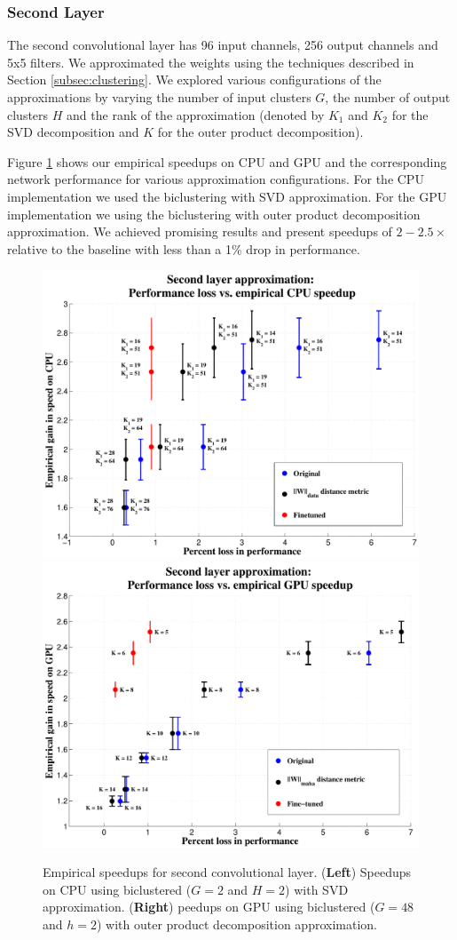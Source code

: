 \subsubsection{Second Layer}
The second convolutional layer has 96 input channels, 256 output channels and 5x5 filters. 
We approximated the weights using the techniques described in Section \ref{subsec:clustering}. 
We explored various configurations of the approximations by varying the number of input clusters $G$, the number of output clusters $H$ and the rank of the approximation (denoted by $K_1$ and $K_2$ for the SVD decomposition and $K$ for the outer product decomposition). 

Figure \ref{fig:biclust_speedups} shows our empirical speedups on CPU
and GPU and the corresponding network performance for
various approximation configurations. For the CPU implementation we used the biclustering with SVD approximation. For the GPU implementation we using the biclustering with outer product decomposition approximation.  
We achieved promising results and present speedups of $2-2.5\times$ relative to the baseline with less than a 1\% drop in performance.

\begin{figure}[t]
\centering
\begin{minipage}{0.9\textwidth}
      \includegraphics[width=0.5\linewidth]{img/layer2_CPUspeedup_vs_performance_loss_finetune_and_orig.pdf}
      \quad
      \includegraphics[width=0.5\linewidth]{img/layer2_GPUspeedup_vs_performance_loss_finetune_and_orig.pdf}
\end{minipage}
\caption{Empirical speedups for second convolutional layer. ({\bf Left}) Speedups on CPU using biclustered ($G = 2$ and $H = 2$) with SVD approximation. ({\bf Right}) peedups on GPU using biclustered ($G = 48$ and $h = 2$) with outer product decomposition approximation.}
\label{fig:biclust_speedups}
\end{figure}


